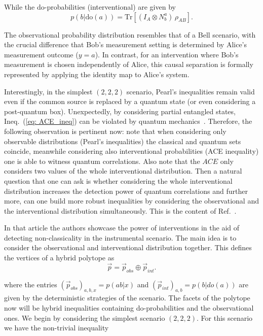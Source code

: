 \documentclass[aps,pra,reprint, superscriptaddress,showkeys]{revtex4-2}
\theoremstyle{plain}
\begin{document}
While the do-probabilities (interventional) are given by 
\begin{equation}
p(b|\mathrm{do}(a)) = \mathrm{Tr}\left[(I_A \otimes N^a_b) \, \rho_{AB}\right].
\end{equation}

The observational probability distribution resembles that of a Bell scenario, with the crucial difference that Bob's measurement setting is determined by Alice's measurement outcome ($y=a$). In contrast, for an intervention where Bob's measurement is chosen independently of Alice, this causal separation is formally represented by applying the identity map to Alice's system.

Interestingly, in the simplest  \( (2, 2, 2) \) scenario, Pearl's  inequalities remain valid even if the common source is replaced by a quantum state (or even considering a post-quantum box). Unexpectedly, by considering partial entangled states, Ineq.~(\ref{eq: ACE_ineq}) can be violated by quantum mechanics~\cite{PhysRevA.104.L010201}.  Therefore, the following observation is pertinent now: note that when considering only observable distributions (Pearl's inequalities) the classical and quantum sets coincide, meanwhile considering also interventional probabilities (ACE inequality) one is able to witness quantum correlations. Also note that the $ACE$  only considers two values of the whole interventional distribution. Then a natural question that one can ask is whether considering the whole interventional distribution increases the detection power of  quantum correlations and further more, can one build more robust inequalities by considering the observational and the interventional distribution simultaneously. This is the content of Ref.~\cite{ObsInt_Bell}. 

In that article the authors showcase the power of interventions in the aid of detecting non-classicality in the instrumental scenario. The main idea is to consider the observational and interventional distribution together. This defines the vertices of a hybrid polytope as 
\begin{equation}
    \vec{p} =  \vec{p}_{obs} \oplus  \vec{p}_{int}.   
\end{equation}

where the entries $(\vec{p}_{obs})_{a,b,x} = p(ab|x)$ and $(\vec{p}_{int})_{a,b} = p(b|do(a))$ are given by the deterministic strategies of the scenario. The facets of the polytope now will be hybrid inequalities containing do-probabilities and the observational ones. We begin by considering the simplest scenario $(2,2,2)$. For this scenario we have the non-trivial inequality
\end{document}
